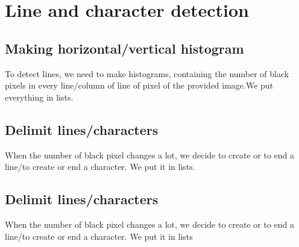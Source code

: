 \section{Line and character detection}

\subsection{Making horizontal/vertical histogram}

To detect lines, we need to make histograms, containing the number of black pixels in every line/column of line of pixel of the provided image.We put everything in lists.

\subsection{Delimit lines/characters}

When the number of black pixel changes a lot, we decide to create or to end a line/to create or end a character. We put it in lists.

\subsection{Delimit lines/characters}

When the number of black pixel changes a lot, we decide to create or to end a line/to create or end a character. We put it in lists
